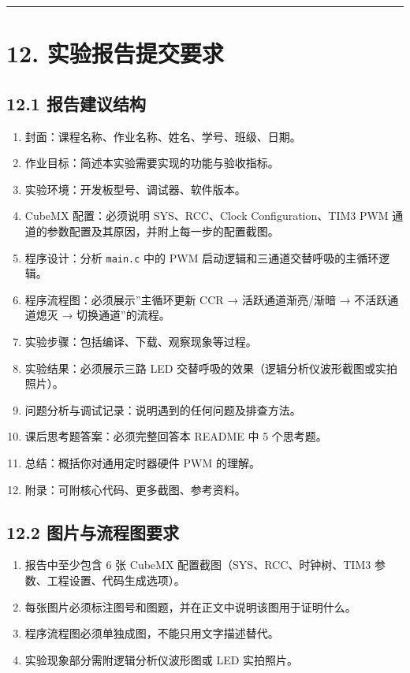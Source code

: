 \documentclass[
  chinese,
  UTF8,
  oneside,
  openany]{ctexbook}
\providecommand{\tightlist}{%
  \setlength{\itemsep}{0pt}\setlength{\parskip}{0pt}}
\begin{document}
\begin{center}\rule{0.5\linewidth}{0.5pt}\end{center}

\section{12.
实验报告提交要求}\label{ux5b9eux9a8cux62a5ux544aux63d0ux4ea4ux8981ux6c42-4}

\subsection{12.1
报告建议结构}\label{ux62a5ux544aux5efaux8baeux7ed3ux6784-7}

\begin{enumerate}
\def\labelenumi{\arabic{enumi}.}
\tightlist
\item
  封面：课程名称、作业名称、姓名、学号、班级、日期。
\item
  作业目标：简述本实验需要实现的功能与验收指标。
\item
  实验环境：开发板型号、调试器、软件版本。
\item
  CubeMX 配置：必须说明 SYS、RCC、Clock Configuration、TIM3 PWM
  通道的参数配置及其原因，并附上每一步的配置截图。
\item
  程序设计：分析 \texttt{main.c} 中的 PWM
  启动逻辑和三通道交替呼吸的主循环逻辑。
\item
  程序流程图：必须展示''主循环更新 CCR → 活跃通道渐亮/渐暗 →
  不活跃通道熄灭 → 切换通道''的流程。
\item
  实验步骤：包括编译、下载、观察现象等过程。
\item
  实验结果：必须展示三路 LED
  交替呼吸的效果（逻辑分析仪波形截图或实拍照片）。
\item
  问题分析与调试记录：说明遇到的任何问题及排查方法。
\item
  课后思考题答案：必须完整回答本 README 中 5 个思考题。
\item
  总结：概括你对通用定时器硬件 PWM 的理解。
\item
  附录：可附核心代码、更多截图、参考资料。
\end{enumerate}

\subsection{12.2
图片与流程图要求}\label{ux56feux7247ux4e0eux6d41ux7a0bux56feux8981ux6c42-7}

\begin{enumerate}
\def\labelenumi{\arabic{enumi}.}
\tightlist
\item
  报告中至少包含 6 张 CubeMX 配置截图（SYS、RCC、时钟树、TIM3
  参数、工程设置、代码生成选项）。
\item
  每张图片必须标注图号和图题，并在正文中说明该图用于证明什么。
\item
  程序流程图必须单独成图，不能只用文字描述替代。
\item
  实验现象部分需附逻辑分析仪波形图或 LED 实拍照片。
\end{enumerate}
\end{document}
